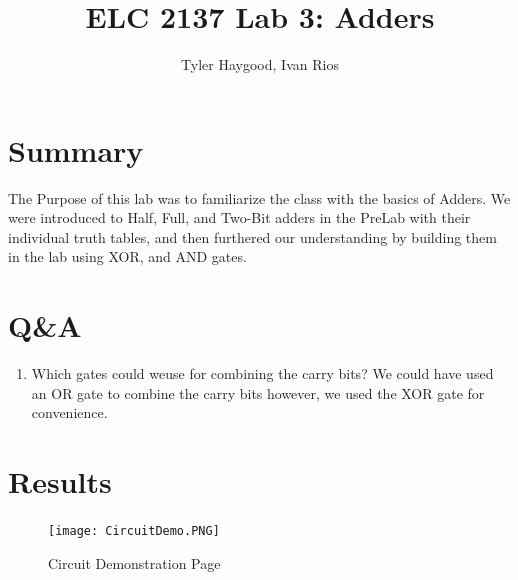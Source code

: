 \documentclass[]{report}
\begin{document}
\title{ELC 2137 Lab 3: Adders}
\author{Tyler Haygood, Ivan Rios}
\maketitle

\section*{Summary}
The Purpose of this lab was to familiarize the class with the basics of Adders.
We were introduced to Half, Full, and Two-Bit adders in the PreLab with their
individual truth tables, and then furthered our understanding by building them in the lab
using XOR, and AND gates.



\section*{Q\&A}
\begin{enumerate}
\item Which gates could weuse  for  combining  the  carry  bits? \newline
We could have used an OR gate to combine the carry bits however, we used the XOR gate for convenience.

\end{enumerate}

\section*{Results}


\begin{figure}[ht]
\centering

\texttt{[image: CircuitDemo.PNG]}
\caption{Circuit Demonstration Page}
\label{fig:Page One of Demo Page}

\end{figure}
\end{document}
